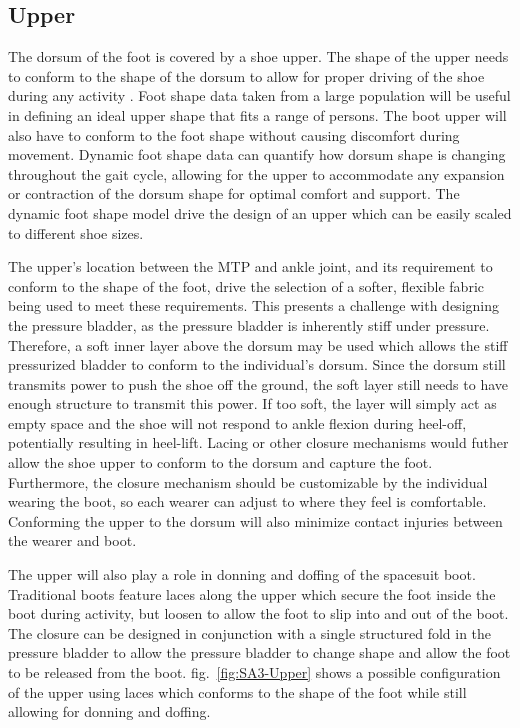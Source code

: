\documentclass[defaultstyle,11pt]{comps}
\begin{document}
\hypertarget{upper}{%
\subsection{Upper}\label{upper}}

The dorsum of the foot is covered by a shoe upper.
The shape of the upper needs to conform to the shape of the dorsum to allow for proper driving of the shoe during any activity \citep{Feeney2019}.
Foot shape data taken from a large population will be useful in defining an ideal upper shape that fits a range of persons.
The boot upper will also have to conform to the foot shape without causing discomfort during movement.
Dynamic foot shape data can quantify how dorsum shape is changing throughout the gait cycle, allowing for the upper to accommodate any expansion or contraction of the dorsum shape for optimal comfort and support.
The dynamic foot shape model drive the design of an upper which can be easily scaled to different shoe sizes.

The upper's location between the MTP and ankle joint, and its requirement to conform to the shape of the foot, drive the selection of a softer, flexible fabric being used to meet these requirements.
This presents a challenge with designing the pressure bladder, as the pressure bladder is inherently stiff under pressure.
Therefore, a soft inner layer above the dorsum may be used which allows the stiff pressurized bladder to conform to the individual's dorsum.
Since the dorsum still transmits power to push the shoe off the ground, the soft layer still needs to have enough structure to transmit this power.
If too soft, the layer will simply act as empty space and the shoe will not respond to ankle flexion during heel-off, potentially resulting in heel-lift.
Lacing or other closure mechanisms would futher allow the shoe upper to conform to the dorsum and capture the foot.
Furthermore, the closure mechanism should be customizable by the individual wearing the boot, so each wearer can adjust to where they feel is comfortable.
Conforming the upper to the dorsum will also minimize contact injuries between the wearer and boot.

The upper will also play a role in donning and doffing of the spacesuit boot.
Traditional boots feature laces along the upper which secure the foot inside the boot during activity, but loosen to allow the foot to slip into and out of the boot.
The closure can be designed in conjunction with a single structured fold in the pressure bladder to allow the pressure bladder to change shape and allow the foot to be released from the boot.
fig.~\ref{fig:SA3-Upper} shows a possible configuration of the upper using laces which conforms to the shape of the foot while still allowing for donning and doffing.
\end{document}
